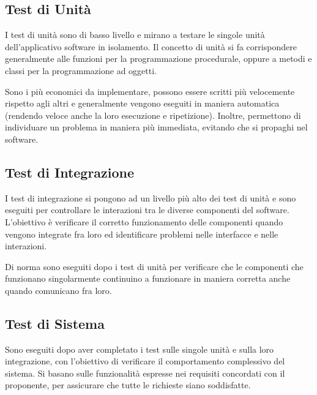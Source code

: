 \subsection{Test di Unità}
\par I test di unità sono di basso livello e mirano a testare le singole unità dell'applicativo software in isolamento. Il concetto di unità si fa corrispondere generalmente alle funzioni per la programmazione procedurale, oppure a metodi e classi per la programmazione ad oggetti.
\par Sono i più economici da implementare, possono essere scritti più velocemente rispetto agli altri e generalmente vengono eseguiti in maniera automatica (rendendo veloce anche la loro esecuzione e ripetizione). Inoltre, permettono di individuare un problema in maniera più immediata, evitando che si propaghi nel software.

\subsection{Test di Integrazione}
\par I test di integrazione si pongono ad un livello più alto dei test di unità e sono eseguiti per controllare le interazioni tra le diverse componenti del software. L'obiettivo è verificare il corretto funzionamento delle componenti quando vengono integrate fra loro ed identificare problemi nelle interfacce e nelle interazioni.
\par Di norma sono eseguiti dopo i test di unità per verificare che le componenti che funzionano singolarmente continuino a funzionare in maniera corretta anche quando comunicano fra loro.

\subsection{Test di Sistema}
\par Sono eseguiti dopo aver completato i test sulle singole unità e sulla loro integrazione, con l'obiettivo di verificare il comportamento complessivo del sistema. Si basano sulle funzionalità espresse nei requisiti concordati con il proponente, per assicurare che tutte le richieste siano soddisfatte.

